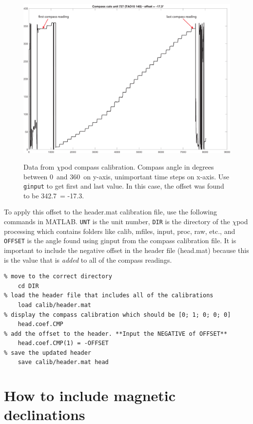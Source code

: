 \documentclass[12pt]{article}
\begin{document}
\begin{figure}[h]
  \centering \centering\noindent\includegraphics[width=12.5cm,angle=0]{./figs/compass_cals_727.pdf}\\
    \caption{Data from $\chi$pod compass calibration. Compass angle in degrees between 0\degree \, and 360\degree \, on y-axis, unimportant time steps on x-axis. Use \texttt{ginput} to get first and last value. In this case, the offset was found to be 342.7\degree \, = -17.3\degree.}\label{fig:compasscals}
\end{figure}


To apply this offset to the header.mat calibration file, use the following commands in MATLAB. \texttt{UNT} is the unit number, \texttt{DIR} is the directory of the $\chi$pod processing which contains folders like calib, mfiles, input, proc, raw, etc., and \texttt{OFFSET} is the angle found using ginput from the compass calibration file. It is important to include the negative offset in the header file (head.mat) because this is the value that is \textit{added} to all of the compass readings.

\begin{verbatim}
% move to the correct directory
    cd DIR
% load the header file that includes all of the calibrations
    load calib/header.mat
% display the compass calibration which should be [0; 1; 0; 0; 0]
    head.coef.CMP
% add the offset to the header. **Input the NEGATIVE of OFFSET**
    head.coef.CMP(1) = -OFFSET
% save the updated header
    save calib/header.mat head
\end{verbatim}



\section{How to include magnetic declinations}
\end{document}
